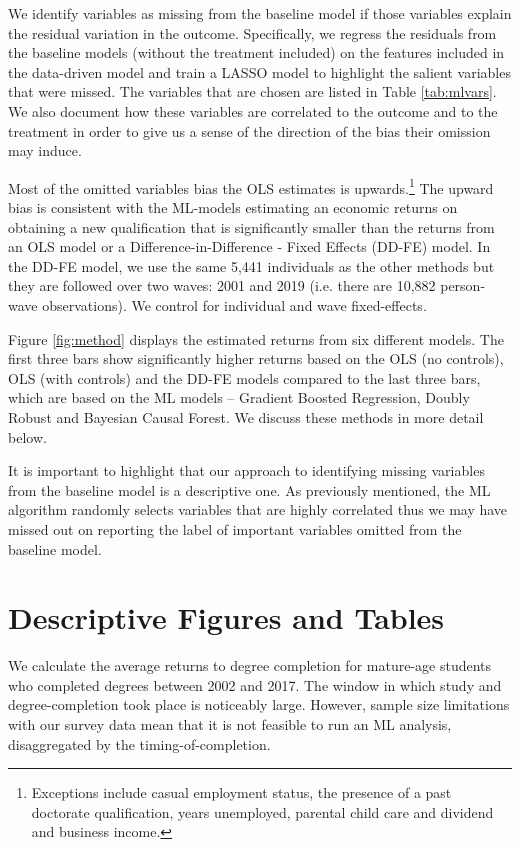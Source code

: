 \documentclass[12pt, a4paper]{article}
\begin{document}
We identify variables as missing from the baseline model if those variables explain the residual variation in the outcome. Specifically, we regress the residuals from the baseline models (without the treatment included) on the features included in the data-driven model and train a LASSO model to highlight the salient variables that were missed. The variables that are chosen are listed in Table \ref{tab:mlvars}. We also document how these variables are correlated to the outcome and to the treatment in order to give us a sense of the direction of the bias their omission may induce. 

Most of the omitted variables bias the OLS estimates is upwards.\footnote{Exceptions include casual employment status, the presence of a past doctorate qualification, years unemployed, parental child care and dividend and business income.} The upward bias is consistent with the ML-models estimating an economic returns on obtaining a new qualification that is significantly smaller than the returns from an OLS model or a Difference-in-Difference - Fixed Effects (DD-FE)  model. In the DD-FE model, we use the same 5,441 individuals as the other methods but they are followed over two waves: 2001 and 2019 (i.e. there are 10,882 person-wave observations). We control for individual and wave fixed-effects. 

Figure \ref{fig:method} displays the estimated returns from six different
models. The first three bars show significantly higher returns based on the OLS
(no controls), OLS (with controls) and the DD-FE models compared to the last
three bars, which are based on the ML models -- Gradient Boosted Regression,
Doubly Robust and Bayesian Causal Forest. We discuss these methods in more
detail below. 

It is important to highlight that our approach to identifying missing variables
from the baseline model is a descriptive one. As previously mentioned,
the ML algorithm randomly selects variables that are highly correlated thus we
may have missed out on reporting the label of important variables omitted from
the baseline model.


\section{Descriptive Figures and Tables}

We calculate the average returns to degree completion for mature-age students who completed degrees between 2002 and 2017. The window in which study and degree-completion took place is noticeably large. However, sample size limitations with our survey data mean that it is not feasible to run an ML analysis, disaggregated by the timing-of-completion.
\end{document}
